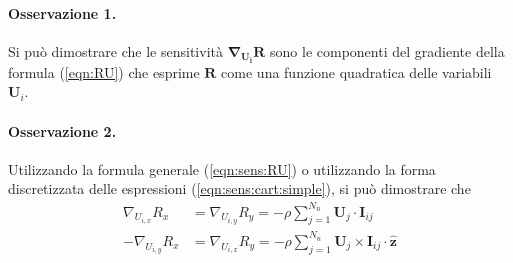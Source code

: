\paragraph{Osservazione 1.} Si può dimostrare che le sensitività $\bm{\nabla}_{\bm{U_i}} \bm{R}$ sono le componenti del gradiente della formula (\ref{eqn:RU}) che esprime $\bm{R}$ come una funzione quadratica delle variabili $\bm{U}_i$.

\paragraph{Osservazione 2.} Utilizzando la formula generale (\ref{eqn:sens:RU}) o utilizzando la forma discretizzata delle espressioni (\ref{eqn:sens:cart:simple}), si può dimostrare che
\begin{equation}
\begin{aligned}
 \nabla_{U_{i,x}} R_x & = \nabla_{U_{i,y}} R_y = - \rho \displaystyle\sum_{j=1}^{N_n} \bm{U}_{j} \cdot \bm{I}_{ij} \\
 -\nabla_{U_{i,y}} R_x & = \nabla_{U_{i,x}} R_y = - \rho \displaystyle\sum_{j=1}^{N_n} \bm{U}_j  \times \bm{I}_{ij}\cdot \bm{\hat{z}} \\
\end{aligned}
\end{equation}

